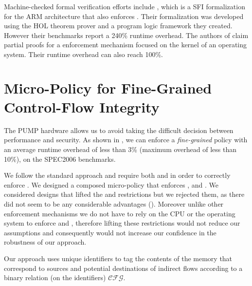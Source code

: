 Machine-checked formal verification efforts include \cite{ZhaoLSR11},
which is a SFI formalization for the ARM architecture that also
enforces \CFI. Their formalization was developed using the HOL
theorem prover and a program logic framework they created. However
their benchmarks report a 240\% runtime overhead. The authors of
\cite{CriswellDA14} claim partial proofs for a \CFI enforcement
mechanism focused on the kernel of an operating system. Their runtime
overhead can also reach 100\%.

\section{Micro-Policy for Fine-Grained Control-Flow Integrity}
\label{sec:cfi_fine}

The PUMP hardware allows us to avoid taking the difficult decision between
performance and security. As shown in \cite{pump_asplos2015}, we can enforce a
\emph{fine-grained} \CFI policy with an average runtime overhead of less than 3\%
(maximum overhead of less than 10\%), on the SPEC2006 benchmarks.

We follow the standard approach and require both \NXD and \NWC in
order to correctly enforce \CFI. We designed a composed micro-policy
that enforces \NXD, \NWC and \CFI. We considered designs that lifted
the \NXD and \NWC restrictions but we rejected them, as there did not
seem to be any considerable advantages (). Moreover unlike
other \CFI enforcement mechanisms we do not have to rely on the CPU or
the operating system to enforce \NXD and \NWC, therefore lifting these
restrictions would not reduce our assumptions and consequently would
not increase our confidence in the robustness of our approach.



Our approach uses unique identifiers to tag the contents of the memory that
correspond to sources and potential destinations of indirect flows according to
a binary relation (on the identifiers) $\mathcal{CFG}$.

